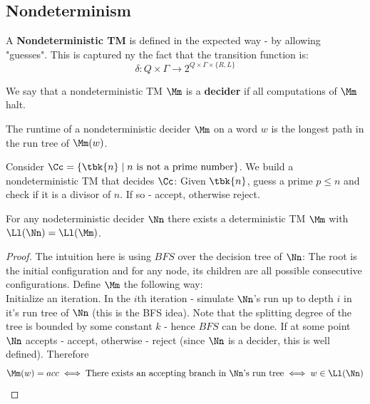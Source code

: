 \subsection{Nondeterminism}
\begin{yellowBox}
	\begin{defn}[nondeterministic TM]
		A \textbf{Nondeterministic TM} is defined in the expected way - by allowing "guesses". This is captured ny the fact that the transition function is:
		\[
		\delta:Q\times \Gamma \to 2^{Q\times \Gamma \times \{R,L\}}
		\]
	\end{defn}
	\begin{defn}[Decider]
		We say that a nondeterministic TM $\Mm$ is a \textbf{decider} if all computations of $\Mm$ halt.
	\end{defn}
\begin{defn}
	The runtime of a nondeterministic decider $\Mm$ on a word $w$ is the longest path in the run tree of $\Mm(w)$.
\end{defn}
\end{yellowBox}
\begin{example}
	Consider $\Cc = \{\tbk{n}\mid n\text{ is not a prime number}\}$. We build a nondeterministic TM that decides $\Cc$: Given $\tbk{n}$, guess a prime $p\leq n$ and check if it is a divisor of $n$. If so - accept, otherwise reject.
\end{example}
\begin{blueBox}
	\begin{thm}[Equivalence]
		For any nodeterministic decider $\Nn$ there exists a deterministic TM $\Mm$ with $\Ll(\Nn) = \Ll(\Mm)$.
\end{thm}\end{blueBox}
\begin{proof}
	The intuition here is using $BFS$ over the decision tree of $\Nn$: The root is the initial configuration and for any node, its children are all possible consecutive configurations. Define $\Mm$ the following way:\\
	Initialize an iteration. In the $i$th iteration - simulate $\Nn$'s run up to depth $i$ in it's run tree of $\Nn$ (this is the BFS idea). Note that the splitting degree of the tree is bounded by some constant $k$ - hence $BFS$ can be done. If at some point $\Nn$ accepts - accept, otherwise - reject (since $\Nn$ is a decider, this is well defined). Therefore
	\[
	\Mm(w) = acc \iff \text{There exists an accepting branch in $\Nn$'s run tree} \iff w\in \Ll(\Nn)
	\]
\end{proof}
